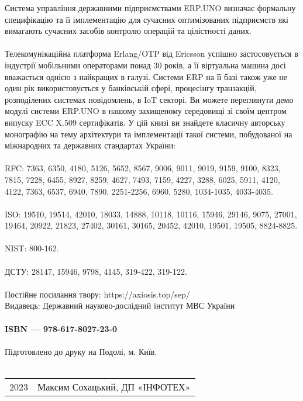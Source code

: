 Система управління державними підприємствами ERP.UNO визначає формальну
специфікацію та її імплементацію для сучасних оптимізованих підприємств
які вимагають сучасних засобів контролю операцій та цілістності даних.
\\
\\
Телекомунікаційна платформа Erlang/OTP від Ericsson успішно застосовується
в індустрії мобільними операторами понад 30 років, а її віртуальна машина
досі вважається однією з найкращих в галузі. Системи ERP на її базі також
уже не один рік використовується у банківській сфері, процесінгу транзакцій,
розподілених системах повідомлень, в IoT секторі. Ви можете переглянути демо
модулі системи ERP.UNO в нашому захищеному середовищі зі своїм центром
випуску ECC X.509 сертифікатів. У цій книзі ви знайдете класичну авторську
монографію на тему архітектури та імплементації такої системи, побудованої
на міжнародних та державних стандартах України:
\\
\\
RFC: 7363, 6350, 4180, 5126, 5652,
     8567, 9006, 9011, 9019, 9159, 9100, 8323, 7815, 7228, 6455,
     8927, 8259, 4627, 7493, 7159, 4227, 3288, 6025, 5911, 4120, 4122, 7363, 6537, 6940, 7890,
     2251-2256, 6960, 5280, 1034-1035, 4033-4035.
\\
\\
ISO: 19510, 19514, 42010, 18033, 14888, 10118, 10116, 15946, 29146,
     9075, 27001,
     19464, 20922, 21823, 27402, 30161, 30165,
     20452, 42010, 19501, 19505,
     8824-8825.
\\
\\
NIST: 800-162.
\\
\\
ДСТУ: 28147, 15946, 9798, 4145, 319-422, 319-122.
\\
\\
Постійне посилання твору: https://axiosis.top/sep/ \\
Видавець: Державний науково-дослідний інститут МВС України
\\
\\
{\bf ISBN --- 978-617-8027-23-0 \hspace{2em}}
\\
\\
Підготовлено до друку на Подолі, м. Київ.
\\
\\
\begin{tabular}{ll}
\textcopyright{} 2023 & Максим Сохацький, ДП «ІНФОТЕХ»
\end{tabular}

\newpage
\cleartorecto
\tableofcontents*
\mainmatter

